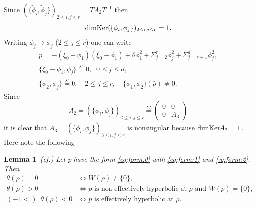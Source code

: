 \documentclass[12pt,leqno]{article} %
\def\sieq{\overset{\Sigma'}{=}}
\def\bro{\bar\rho}
\def\bro{\bar\rho}
\numberwithin{equation}{section}
\newtheorem{lem}{Lemma}[section]
\begin{document}
%
Since $(\{\tilde\phi_i,\tilde\phi_j\})_{2\leq i,j\leq r}=TA_2T^{-1}$ then 
%
\[
{\rm dim Ker}(\{\tilde\phi_i,\tilde\phi_j\})_{2\leq i,j\leq r}=1.
\]
%
Writing $\tilde\phi_j\to\phi_j$ ($2\leq j\leq r$) one can write
%
%
\begin{equation}
\label{eq:form:2bis}
\begin{split}
p=-(\xi_0+\phi_1)(\xi_0-\phi_1)+\theta \phi_1^2+\Sigma_{j=2}^r\phi_j^2+\Sigma_{j=r+1}^d\phi_j^2,\\
\{\xi_0-\phi_1,\phi_j\}
\sieq 0,\;\;0\leq j\leq d,\\
 \{\phi_2,\phi_j\}\sieq 0, \quad 2\leq j\leq r,\quad \{\phi_1,\phi_2\}(\bro)\neq 0.
\end{split}
\end{equation}
%
%
Since
%
\[
A_2=(\{\phi_i,\phi_j\})_{2\leq i, j\leq r}\sieq \begin{pmatrix}0&0\\
0&A_3\end{pmatrix}
\]
%
it is clear that $A_3=(\{\phi_i,\phi_j\})_{3\leq i,j\leq r}$ is nonsingular because ${\rm dim Ker}A_2=1$. 
Here note the following 
\begin{lem}{\rm(cf.\cite{MR2942985})}
\label{lem:BPP}Let $p$ have the form \eqref{eq:form:0} with \eqref{eq:form:1} and \eqref{eq:form:2}.
Then
%
\begin{align*}
\theta(\rho)=0&\Longleftrightarrow W(\rho)\neq \{0\},\\
\theta(\rho)>0& \Longleftrightarrow \text{$p$ is non-effectively hyperbolic at $\rho$ and $W(\rho)=\{0\}$},\\
(-1<)\;\;\theta(\rho)<0 &\Longleftrightarrow  \text{$p$ is effectively hyperbolic at $\rho$}.
\end{align*}
%
\end{lem}
%
\end{document}
